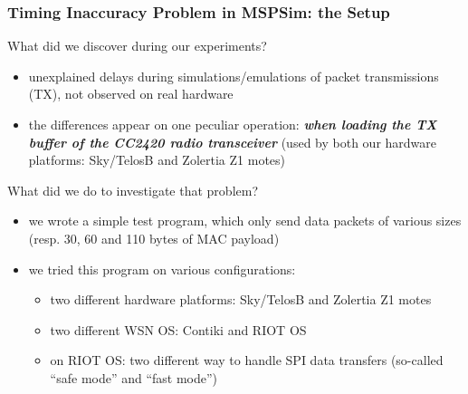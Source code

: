\documentclass[10pt,c]{beamer}
\renewcommand{\emph}[1]{\textbf{\textit{#1}}}
\begin{document}
\begin{frame}
\frametitle{Timing Inaccuracy Problem in MSPSim: the Setup}
\begin{alertblock}{What did we discover during our experiments?}
\begin{itemize}
\item unexplained delays during simulations/emulations of packet
transmissions (TX), not observed on real hardware
\item the differences appear on one peculiar operation: \emph{when loading
the TX buffer of the CC2420 radio transceiver} {\small(used by both our
hardware platforms: Sky/TelosB and Zolertia Z1 motes)}
\end{itemize}
\end{alertblock}
\begin{block}{What did we do to investigate that problem?}
\begin{itemize}
\item we wrote a simple test program, which only send data packets of
various sizes (resp. 30, 60 and 110 bytes of MAC payload)
\item we tried this program on various configurations:
  \begin{itemize}
  \item two different hardware platforms: Sky/TelosB and Zolertia Z1 motes
  \item two different WSN OS: Contiki and RIOT OS
  \item on RIOT OS: two different way to handle SPI data transfers
        (so-called ``safe mode'' and ``fast mode'')
  \end{itemize}
\end{itemize}
\end{block}
\end{frame}
\end{document}
